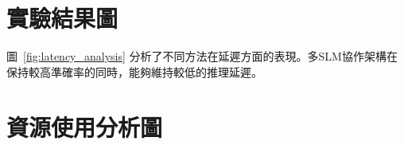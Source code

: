 \section{實驗結果圖}



圖~\ref{fig:latency_analysis} 分析了不同方法在延遲方面的表現。多SLM協作架構在保持較高準確率的同時，能夠維持較低的推理延遲。


\section{資源使用分析圖}


